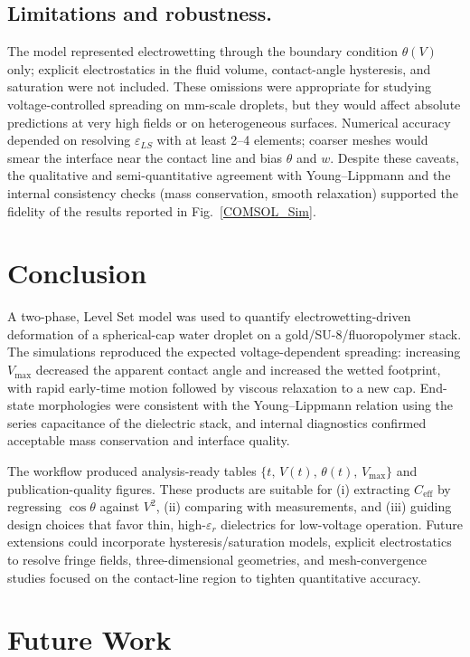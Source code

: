 \documentclass[9pt,a4paper,twocolumn,twoside]{tau-class/tau}
\begin{document}
\subsection{Limitations and robustness.}
The model represented electrowetting through the boundary condition \(\theta(V)\) only; explicit electrostatics in the fluid volume, contact-angle hysteresis, and saturation were not included. These omissions were appropriate for studying voltage-controlled spreading on mm-scale droplets, but they would affect absolute predictions at very high fields or on heterogeneous surfaces. Numerical accuracy depended on resolving \(\varepsilon_{LS}\) with at least 2–4 elements; coarser meshes would smear the interface near the contact line and bias \(\theta\) and \(w\). Despite these caveats, the qualitative and semi-quantitative agreement with Young–Lippmann and the internal consistency checks (mass conservation, smooth relaxation) supported the fidelity of the results reported in Fig.~\ref{COMSOL_Sim}.

\section{Conclusion}
A two-phase, Level Set model was used to quantify electrowetting-driven deformation of a spherical-cap water droplet on a gold/SU-8/fluoropolymer stack. The simulations reproduced the expected voltage-dependent spreading: increasing \(V_{\max}\) decreased the apparent contact angle and increased the wetted footprint, with rapid early-time motion followed by viscous relaxation to a new cap. End-state morphologies were consistent with the Young–Lippmann relation using the series capacitance of the dielectric stack, and internal diagnostics confirmed acceptable mass conservation and interface quality.

The workflow produced analysis-ready tables \(\{t,\,V(t),\,\theta(t),\,V_{\max}\}\) and publication-quality figures. These products are suitable for (i) extracting \(C_{\mathrm{eff}}\) by regressing \(\cos\theta\) against \(V^2\), (ii) comparing with measurements, and (iii) guiding design choices that favor thin, high-\(\varepsilon_r\) dielectrics for low-voltage operation. Future extensions could incorporate hysteresis/saturation models, explicit electrostatics to resolve fringe fields, three-dimensional geometries, and mesh-convergence studies focused on the contact-line region to tighten quantitative accuracy.

\section{Future Work}
\end{document}
